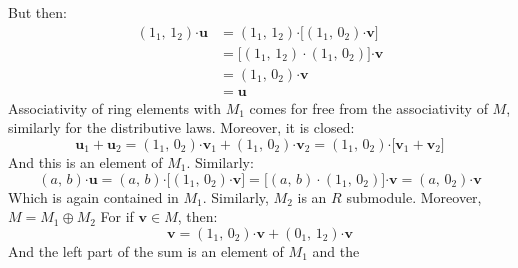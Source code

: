 \documentclass[crop=false,class=article]{standalone}                       %
\begin{document}
\begin{solution}
            But then:
            \begin{subequations}
                \begin{align}
                    (1_{1},\,1_{2})\boldsymbol{\cdot}\mathbf{u}
                    &=(1_{1},\,1_{2})\boldsymbol{\cdot}
                        \big[
                            (1_{1},\,0_{2})\boldsymbol{\cdot}\mathbf{v}
                        \big]\\
                    &=\big[(1_{1},\,1_{2})\cdot(1_{1},\,0_{2})\big]
                        \boldsymbol{\cdot}\mathbf{v}\\
                    &=(1_{1},\,0_{2})\boldsymbol{\cdot}\mathbf{v}\\
                    &=\mathbf{u}
                \end{align}
            \end{subequations}
            Associativity of ring elements with $M_{1}$ comes for free from
            the associativity of $M$, similarly for the distributive laws.
            Moreover, it is closed:
            \begin{equation}
                \mathbf{u}_{1}+\mathbf{u}_{2}=
                (1_{1},\,0_{2})\boldsymbol{\cdot}\mathbf{v}_{1}+
                (1_{1},\,0_{2})\boldsymbol{\cdot}\mathbf{v}_{2}
                =(1_{1},\,0_{2})\boldsymbol{\cdot}
                    \big[\mathbf{v}_{1}+\mathbf{v}_{2}\big]
            \end{equation}
            And this is an element of $M_{1}$. Similarly:
            \begin{equation}
                (a,\,b)\boldsymbol{\cdot}\mathbf{u}
                =(a,\,b)\boldsymbol{\cdot}
                    \big[
                        (1_{1},\,0_{2})\boldsymbol{\cdot}\mathbf{v}
                    \big]
                =\big[
                    (a,\,b)\cdot(1_{1},\,0_{2})
                \big]
                    \boldsymbol{\cdot}\mathbf{v}
                =(a,\,0_{2})\boldsymbol{\cdot}\mathbf{v}
            \end{equation}
            Which is again contained in $M_{1}$. Similarly, $M_{2}$ is an
            $R$ submodule. Moreover, $M=M_{1}\oplus{M}_{2}$ For if
            $\mathbf{v}\in{M}$, then:
            \begin{equation}
                \mathbf{v}=(1_{1},\,0_{2})\boldsymbol{\cdot}\mathbf{v}+
                           (0_{1},\,1_{2})\boldsymbol{\cdot}\mathbf{v}
            \end{equation}
            And the left part of the sum is an element of $M_{1}$ and the

\end{solution}
\end{document}
